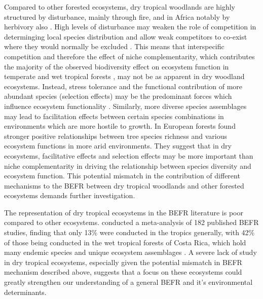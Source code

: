 \documentclass[11pt,a4paper]{article}
\begin{document}
Compared to other forested ecosystems, dry tropical woodlands are highly structured by disturbance, mainly through fire, and in Africa notably by herbivory also \citep{}. High levels of disturbance may weaken the role of competition in determinging local species distribution and allow weak competitors to co-exist where they would normally be excluded \citep{Grime1979, Grace1990}. This means that interspecific competition and therefore the effect of niche complementarity, which contributes the majority of the observed biodiversity effect on ecosystem function in temperate and wet tropical forests \citep{Wright2017, Poorter2015, Sande2017a}, may not be as apparent in dry woodland ecosystems. Instead, stress tolerance and the functional contribution of more abundant species (selection effects) may be the predominant forces which influence ecosystem functionality \citep{Lasky2014, Tobner2016}. Similarly, more diverse species assemblages may lead to facilitation effects between certain species combinations in environments which are more hostile to growth. In European forests \citep{Ratcliffe2017} found stronger positive relationships between tree species richness and various ecosystem functions in more arid environments. They suggest that in dry ecosystems, facilitative effects and selection effects may be more important than niche complementarity in driving the relationship between species diversity and ecosystem function. This potential mismatch in the contribution of different mechanisms to the BEFR between dry tropical woodlands and other forested ecosystems demands further investigation. 



The representation of dry tropical ecosystems in the BEFR literature is poor compared to other ecosystems. \citet{Clarke2017} conducted a meta-analysis of 182 published BEFR studies, finding that only 13\% were conducted in the tropics generally, with 42\% of those being conducted in the wet tropical forests of Costa Rica, which hold many endemic species and unique ecosystem assemblages \citep{Barthlott2005}. A severe lack of study in dry tropical ecosystems, especially given the potential mismatch in BEFR mechanism described above, suggests that a focus on these ecosystems could greatly strengthen our understanding of a general BEFR and it's environmental determinants.
\end{document}
